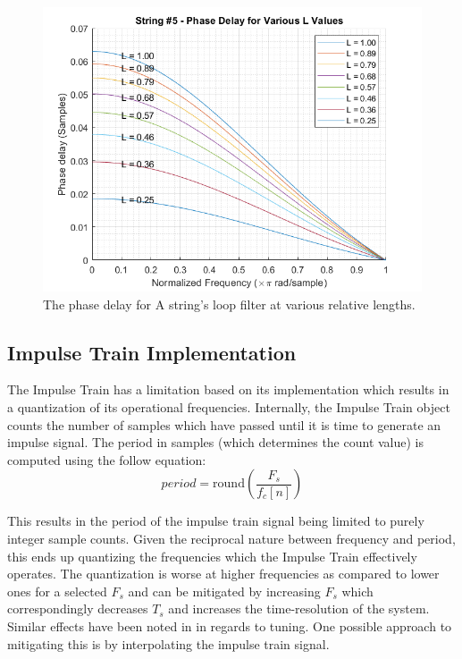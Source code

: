 \documentclass[../main.tex]{subfiles}
\begin{document}
\begin{figure}[h]
    \centering
    \includegraphics[scale=.65]{./images/plots/String 5 - Phase Delays.png}
    \caption{The phase delay for A string's loop filter at various relative lengths.}
    \label{fig:Str5PhaseDelays}
\end{figure}

\clearpage

\subsection{Impulse Train Implementation}
The Impulse Train has a limitation based on its implementation which results in a quantization of its operational frequencies. Internally, the Impulse Train object counts the number of samples which have passed until it is time to generate an impulse signal. The period in samples (which determines the count value) is computed using the follow equation:
\begin{equation}
    period = \text{round}\left(\frac{F_s}{f_c[n]}\right)
    \label{eq:f_cQuantization}
\end{equation}

This results in the period of the impulse train signal being limited to purely integer sample counts. Given the reciprocal nature between frequency and period, this ends up quantizing the frequencies which the Impulse Train effectively operates. The quantization is worse at higher frequencies as compared to lower ones for a selected $F_s$ and can be mitigated by increasing $F_s$ which correspondingly decreases $T_s$ and increases the time-resolution of the system. Similar effects have been noted in  in regards to tuning. One possible approach to mitigating this is by interpolating the impulse train signal.
\end{document}
